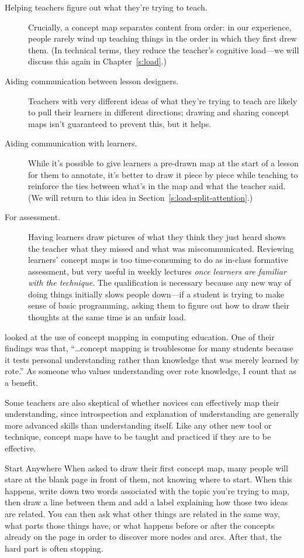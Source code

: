 \begin{description}
\item[Helping teachers figure out what they're trying to teach.]
Crucially, a concept map separates content from order: in our
experience, people rarely wind up teaching things in the order in
which they first drew them. (In technical terms, they reduce the
teacher's cognitive load---we will discuss this again in
Chapter~\ref{s:load}.)
\item[Aiding communication between lesson designers.]
Teachers with very different ideas of what they're trying to teach
are likely to pull their learners in different directions; drawing
and sharing concept maps isn't guaranteed to prevent this, but it
helps.
\item[Aiding communication with learners.]
While it's possible to give learners a pre-drawn map at the start of
a lesson for them to annotate, it's better to draw it piece by piece
while teaching to reinforce the ties between what's in the map and
what the teacher said. (We will return to this idea in
Section~\ref{s:load-split-attention}.)
\item[For assessment.]
Having learners draw pictures of what they think they just heard
shows the teacher what they missed and what was miscommunicated.
Reviewing learners' concept maps is too time-consuming to do as
in-class formative assessment, but very useful in weekly lectures
\emph{once learners are familiar with the technique}. The qualification
is necessary because any new way of doing things initially slows
people down---if a student is trying to make sense of basic
programming, asking them to figure out how to draw their thoughts at
the same time is an unfair load.
\end{description}

\cite{Kepp2008} looked at the use of concept mapping in computing
education. One of their findings was that, ``{\ldots}concept
mapping is troublesome for many students because it tests personal
understanding rather than knowledge that was merely learned by rote.'' As
someone who values understanding over rote knowledge, I count that as a
benefit.

Some teachers are also skeptical of whether novices can effectively map
their understanding, since introspection and explanation of
understanding are generally more advanced skills than understanding
itself. Like any other new tool or technique, concept maps have to be
taught and practiced if they are to be effective.

\begin{aside}{Start Anywhere}
  When asked to draw their first concept map, many people will stare at
  the blank page in front of them, not knowing where to start. When this
  happens, write down two words associated with the topic you're trying
  to map, then draw a line between them and add a label explaining how
  those two ideas are related. You can then ask what other things are
  related in the same way, what parts those things have, or what happens
  before or after the concepts already on the page in order to discover
  more nodes and arcs. After that, the hard part is often stopping.
\end{aside}

